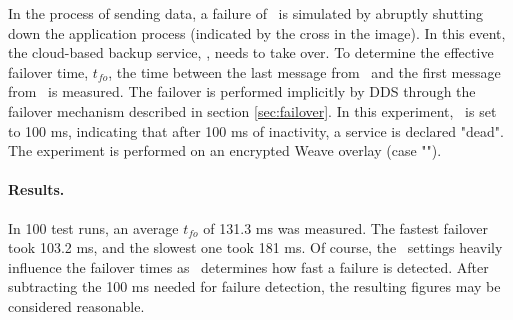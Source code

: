 In the process of sending data, a failure of \proda\ is simulated by abruptly shutting down the application process (indicated by the cross in the image). In this event, the cloud-based backup service, \prodb , needs to take over. To determine the effective failover time, $t_{fo}$, the time between the last message from \proda\ and the first message from \prodb\ is measured. The failover is performed implicitly by DDS through the failover mechanism described in section \ref{sec:failover}. In this experiment, \liveliness\ is set to 100 ms, indicating that after 100 ms of inactivity, a service is declared "dead". The experiment is performed on an encrypted Weave overlay (case "").



\paragraph{Results.} In 100 test runs, an average $t_{fo}$ of 131.3 ms was measured. The fastest failover took 103.2 ms, and the slowest one took 181 ms. Of course, the \liveliness\ settings heavily influence the failover times as \liveliness\ determines how fast a failure is detected. After subtracting the 100 ms needed for failure detection, the resulting figures may be considered reasonable.
%
%
%
%
%
%
%
%
%
%
%
%
%
%
%
%
%
%
%
%